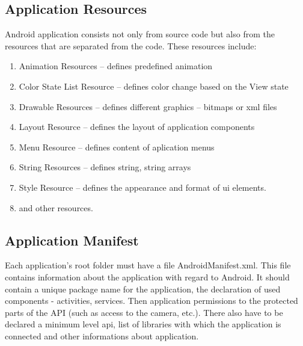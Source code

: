 \subsection{Application Resources} %
Android application consists not only from source code but also from the resources that are separated from the code. These resources include:
\begin{enumerate}
\item Animation Resources -- defines predefined animation
\item Color State List Resource -- defines color change based on the View state
\item Drawable Resources -- defines different graphics -- bitmaps or xml files
\item Layout Resource -- defines the layout of application components
\item Menu Resource -- defines content of aplication menus
\item String Resources -- defines string, string arrays
\item Style Resource -- defines the appearance and format of ui elements.
\item and other resources.
\end{enumerate}

\subsection{Application Manifest} %
Each application's root folder must have a file AndroidManifest.xml. This file contains information about the application with regard to Android. It should contain a unique package name for the application, the declaration of used components - activities, services. Then application permissions to the protected parts of the API (such as access to the camera, etc.). There also have to be declared a minimum level api, list of libraries with which the application is connected and other informations about application.

